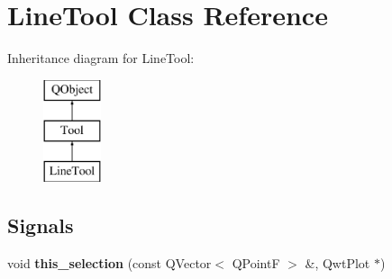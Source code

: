 \hypertarget{classLineTool}{}\section{Line\+Tool Class Reference}
\label{classLineTool}
Inheritance diagram for Line\+Tool\+:\begin{figure}[H]
\begin{center}
\leavevmode
\includegraphics[height=3.000000cm]{classLineTool}
\end{center}
\end{figure}
\subsection*{Signals}
\begin{DoxyCompactItemize}
\item 
\mbox{\label{classTool_a68dea3e4c911f3174176084d350865cc}} 
void {\bfseries this\+\_\+selection} (const Q\+Vector$<$ Q\+PointF $>$ \&, Qwt\+Plot $\ast$)
\end{DoxyCompactItemize}
